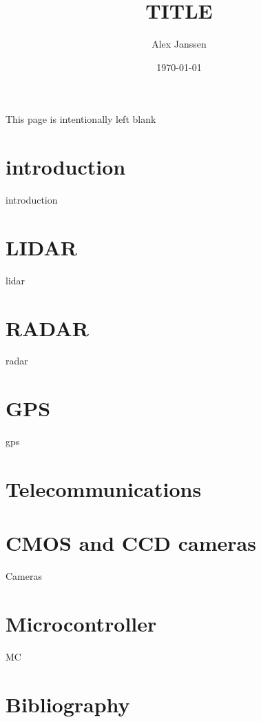 \documentclass[parskip=full,11pt,a4paper,titlepage]{article}
\title{TITLE}
\author{Alex Janssen}
\date{\today}
\begin{document}



\clearpage

\begin{center}
This page is intentionally left blank
\end{center}
\clearpage



\tableofcontents
\clearpage

\section{introduction}
{introduction}
\clearpage

\section{LIDAR}
{lidar}
\clearpage

\section{RADAR}
{radar}

\section{GPS}
{gps}
\clearpage

\section{Telecommunications}

\section{CMOS and CCD cameras}
{Cameras}
\clearpage

\section{Microcontroller}
{MC}
\clearpage

\section{Bibliography}








\end{document}
